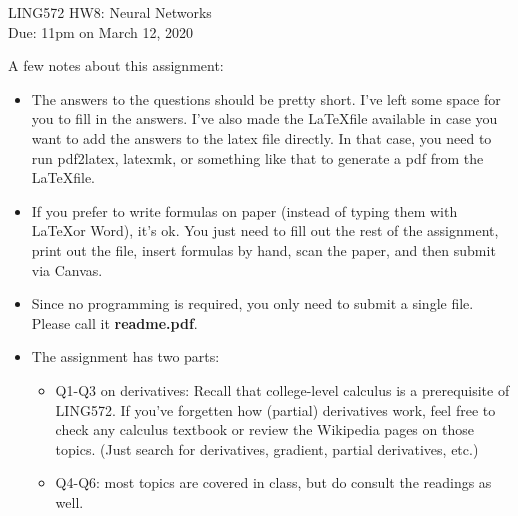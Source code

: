 \documentclass[11pt]{article}
\begin{document}
\begin{center}
\LARGE
LING572 HW8: Neural Networks\\
Due: 11pm on March 12, 2020\\
\vspace{0.3in}
\end{center}

A few notes about this assignment:
\begin{itemize}

 \item The answers to the questions should be pretty short. I've left some space for you to fill in the answers. I've also made the \LaTeX file available in case you want to add the answers to the latex file directly. In that case, you need to run pdf2latex, latexmk, or something like that to generate a pdf from the \LaTeX file.

 \item If you prefer to write formulas on paper (instead of typing them with \LaTeX or Word), it's ok. You just need to fill out the rest of the assignment, print out the file, insert formulas by hand, scan the paper, and then submit via Canvas.

 \item Since no programming is required, you only need to submit a single
     file. Please call it {\bf readme.pdf}.

  \item The assignment has two parts:
    \begin{itemize}
    \item Q1-Q3 on derivatives: Recall that college-level calculus is
      a prerequisite of LING572. If you've forgetten how (partial) derivatives work,
      feel free to check any calculus textbook or review the Wikipedia pages
      on those topics. (Just search for derivatives, gradient, partial derivatives,
      etc.)

    \item Q4-Q6: most topics are covered in class, but do consult the readings as well.
    \end{itemize}
    
\end{itemize}
\end{document}
